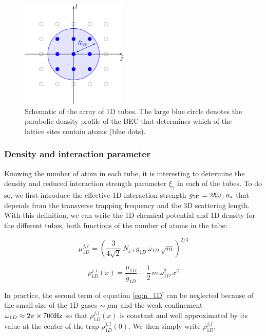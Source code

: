 \begin{figure}
    \centering
    \includegraphics[width=0.45\textwidth]{Fig/Chapter5/tubes_occupes.png}
    \caption[Schematic of the array of 1D tubes]{Schematic of the array of 1D tubes. The large blue circle denotes the parabolic density profile of the BEC that determines which of the lattice sites contain atoms (blue dots).}
    \label{fig:my_label}
\end{figure}

\subsubsection{Density and interaction parameter}


Knowing the number of atom in each tube, it is interesting to determine the density and reduced interaction strength parameter $\xi_{\gamma}$ in each of the tubes. To do so, we first introduce the effective 1D interaction strength $g_{\rm{1D}} = 2 \hbar \omega_{\perp} a_s$ \cite{olshanii1998atomic} that depends from the transverse trapping frequency and the 3D scattering length. With this definition, we can write the 1D chemical potential and 1D density for the different tubes, both functions of the number of atoms in the tube:

\begin{equation}
    \mu_{1D}^{j,l} = \left( \frac{3}{4 \sqrt{2}} \, N_{j,l}\,  g_{1D} \, \omega_{1D}\,  \sqrt{m} \right)^{2/3}
\end{equation}

\begin{equation}\label{eq:n_1D}
    \rho_{1D}^{j,l}(x) = \frac{\mu_{1D}}{g_{1D}} - \frac{1}{2} \, m \, \omega_{1D}^2 \, x^2
\end{equation}

\noindent In practice, the second term of equation \ref{eq:n_1D} can be neglected because of the small size of the 1D gases $\sim \mu \rm{m}$ and the weak confinement $\omega_{1D} \approx 2 \pi \times 700 \rm{Hz}$ so that $\rho_{1D}^{j,l}(x)$ is constant and well approximated by its value at the center of the trap $\rho_{1D}^{j,l}(0)$. We then simply write $\rho_{1D}^{j,l}$.

